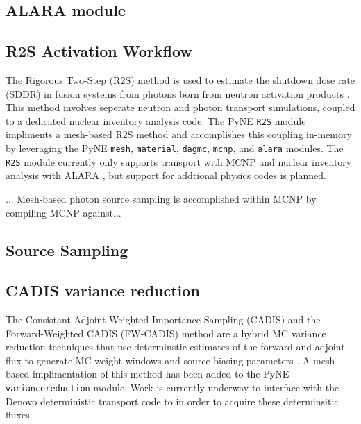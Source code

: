 \documentclass{anstrans}
\begin{document}
\subsection{ALARA module}


\subsection{R2S Activation Workflow}

The Rigorous Two-Step (R2S) method is used to estimate the shutdown dose rate
(SDDR) in fusion systems from photons born from neutron activation products
\cite{chen_rigorous_2002}. This method involves seperate neutron and photon
transport simulations, coupled to a dedicated nuclear inventory analysis code.
The PyNE \texttt{R2S} module impliments a mesh-based R2S method and
accomplishes this coupling in-memory by leveraging the PyNE \texttt{mesh},
\texttt{material}, \texttt{dagmc}, \texttt{mcnp}, and \texttt{alara} modules.
The \texttt{R2S} module currently only supports transport with MCNP and nuclear
inventory analysis with ALARA \cite{wilson_validation_1998}, but support for
addtional physics codes is planned. 

... Mesh-based photon source sampling is accomplished within MCNP by compiling MCNP against...


\subsection{Source Sampling}


\subsection{CADIS variance reduction}

The Consistant Adjoint-Weighted Importance Sampling (CADIS) and the
Forward-Weighted CADIS (FW-CADIS) method are a hybrid MC variance reduction
techniques that use determinstic estimates of the forward and adjoint flux to
generate MC weight windows and source biasing parameters
\cite{haghighat_monte_2003}. A mesh-based implimentation of this method has
been added to the PyNE \texttt{variancereduction} module. Work is currently
underway to interface with the Denovo \cite{Denovo} deterministic transport
code to in order to acquire these determinsitic fluxes.
\end{document}
